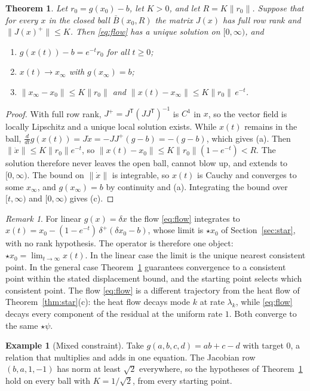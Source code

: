 \documentclass[11pt,letterpaper]{article}
\theoremstyle{plain}
\newtheorem{theorem}{Theorem}
\theoremstyle{definition}
\newtheorem{example}{Example}
\theoremstyle{remark}
\newtheorem{remark}{Remark}
\newcommand{\norm}[1]{\lVert #1\rVert}
\newcommand{\pinv}{^{+}}
\newcommand{\tr}{^{\mathsf T}}
\begin{document}
\begin{theorem}\label{thm:general}
Let $r_0=g(x_0)-b$, let $K>0$, and let $R=K\norm{r_0}$. Suppose that for every $x$ in the closed ball $\bar B(x_0,R)$ the matrix $J(x)$ has full row rank and $\norm{J(x)\pinv}\le K$. Then \eqref{eq:flow} has a unique solution on $[0,\infty)$, and
\begin{enumerate}[label=(\alph*)]
\item $g(x(t))-b=e^{-t}r_0$ for all $t\ge0$;
\item $x(t)\to x_\infty$ with $g(x_\infty)=b$;
\item $\norm{x_\infty-x_0}\le K\norm{r_0}$ and $\norm{x(t)-x_\infty}\le K\norm{r_0}\,e^{-t}$.
\end{enumerate}
\end{theorem}

\begin{proof}
With full row rank, $J\pinv=J\tr(JJ\tr)^{-1}$ is $C^{1}$ in $x$, so the vector field is locally Lipschitz and a unique local solution exists. While $x(t)$ remains in the ball, $\tfrac{d}{dt}g(x(t))=J\dot x=-JJ\pinv(g-b)=-(g-b)$, which gives (a). Then $\norm{\dot x}\le K\norm{r_0}e^{-t}$, so $\norm{x(t)-x_0}\le K\norm{r_0}(1-e^{-t})<R$. The solution therefore never leaves the open ball, cannot blow up, and extends to $[0,\infty)$. The bound on $\norm{\dot x}$ is integrable, so $x(t)$ is Cauchy and converges to some $x_\infty$, and $g(x_\infty)=b$ by continuity and (a). Integrating the bound over $[t,\infty)$ and $[0,\infty)$ gives (c). \qedhere
\end{proof}

\begin{remark}
For linear $g(x)=\delta x$ the flow \eqref{eq:flow} integrates to $x(t)=x_0-(1-e^{-t})\,\delta\pinv(\delta x_0-b)$, whose limit is $\star x_0$ of Section~\ref{sec:star}, with no rank hypothesis. The operator is therefore one object: $\star x_0=\lim_{t\to\infty}x(t)$. In the linear case the limit is the unique nearest consistent point. In the general case Theorem~\ref{thm:general} guarantees convergence to a consistent point within the stated displacement bound, and the starting point selects which consistent point. The flow \eqref{eq:flow} is a different trajectory from the heat flow of Theorem~\ref{thm:star}(c): the heat flow decays mode $k$ at rate $\lambda_k$, while \eqref{eq:flow} decays every component of the residual at the uniform rate $1$. Both converge to the same $\star\psi$.
\end{remark}

\begin{example}[Mixed constraint]
Take $g(a,b,c,d)=ab+c-d$ with target $0$, a relation that multiplies and adds in one equation. The Jacobian row $(b,a,1,-1)$ has norm at least $\sqrt2$ everywhere, so the hypotheses of Theorem~\ref{thm:general} hold on every ball with $K=1/\sqrt2$, from every starting point.
\end{example}
\end{document}
